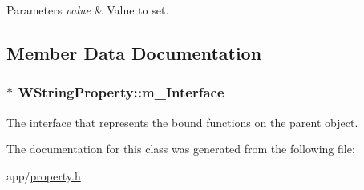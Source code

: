 \begin{DoxyParams}{Parameters}
{\em value} & Value to set. \\
\hline
\end{DoxyParams}


\subsection{Member Data Documentation}
\hypertarget{class_w_string_property_a2a678d70f25fed457ee88e4b1ff85b68}{
\subsubsection[{m\-\_\-\-Interface}]{$\ast$ W\-String\-Property\-::m\-\_\-\-Interface\hspace{0.3cm}{\ttfamily [protected]}}}\label{class_w_string_property_a2a678d70f25fed457ee88e4b1ff85b68}
The interface that represents the bound functions on the parent object. 

The documentation for this class was generated from the following file\-:\begin{DoxyCompactItemize}
\item 
app/\hyperlink{property_8h}{property.\-h}\end{DoxyCompactItemize}
